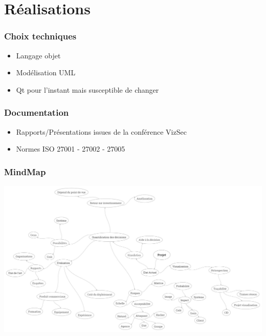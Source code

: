 \documentclass{beamer}
\begin{document}
  \section{Réalisations}
  \begin{frame}
   \frametitle{Choix techniques}
   \begin{itemize}
    \item Langage objet
    \item Modélisation UML
    \item Qt pour l'instant mais susceptible de changer
   \end{itemize}
  \end{frame}
  
  \begin{frame}
   \frametitle{Documentation}
   \begin{itemize}
    \item Rapports/Présentations issues de la conférence VizSec
    \item Normes ISO 27001 - 27002 - 27005
   \end{itemize}
  \end{frame}

  \begin{frame}
   \frametitle{MindMap}
   \begin{center}
    \includegraphics[scale=0.15]{mindmap.jpg}
   \end{center}
  \end{frame}
  
\end{document}
